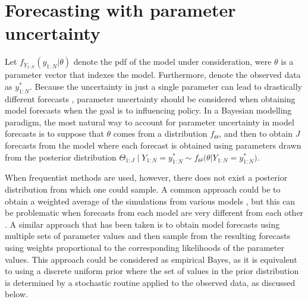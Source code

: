 \section{Forecasting with parameter uncertainty}

Let $f_{Y_{1:N}}(y_{1:N} | \theta)$ denote the pdf of the model under consideration, were $\theta$ is a parameter vector that indexes the model.
Furthermore, denote the observed data as $y_{1:N}^*$.
Because the uncertainty in just a single parameter can lead to drastically different forecasts \citep{saltelli20},
parameter uncertainty should be considered when obtaining model forecasts when the goal is to influencing policy.
In a Bayesian modelling paradigm, the most natural way to account for parameter uncertainty in model forecasts is to suppose that $\theta$ comes from a distribution $f_{\Theta}$, and then to obtain $J$ forecasts from the model where each forecast is obtained using parameters drawn from the posterior distribution $\Theta_{1:J} \mid Y_{1:N} = y_{1:N}^* \sim f_{\Theta}\big(\theta | Y_{1:N} = y_{1:N}^*\big)$.

When frequentist methods are used, however, there does not exist a posterior distribution from which one could sample.
A common approach could be to obtain a weighted average of the simulations from various models \citep{hoeting99}, but this can be problematic when forecasts from each model are very different from each other \citep{grueber11}.
A similar approach that has been taken \citep{king15} is to obtain model forecasts using multiple sets of parameter values and then sample from the resulting forecasts using weights proportional to the corresponding likelihoods of the parameter values.
This approach could be considered as empirical Bayes, as it is equivalent to using a discrete uniform prior where the set of values in the prior distribution is determined by a stochastic routine applied to the observed data, as discussed below.

